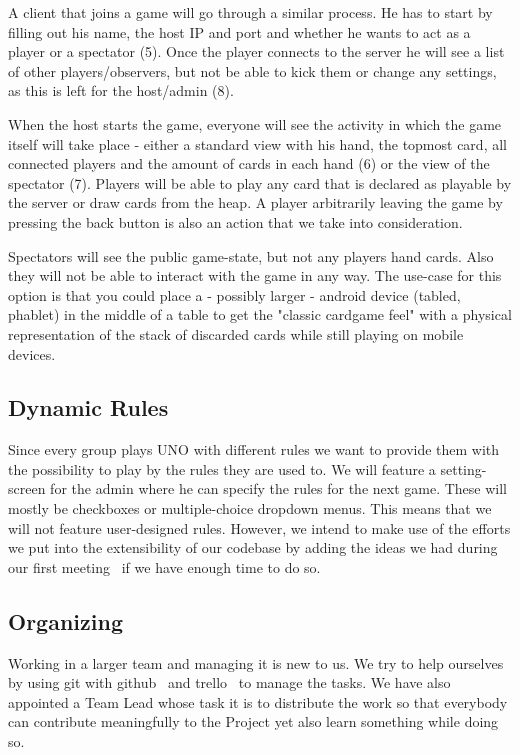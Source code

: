\documentclass{sig-alternate}
\begin{document}
A client that joins a game will go through a similar process. He has to start by filling out his name, the host IP and port and whether he wants to act as a player or a spectator (5). Once the player connects to the server he will see a list of other players/observers, but not be able to kick them or change any settings, as this is left for the host/admin (8). 

When the host starts the game, everyone will see the activity in which the game itself will take place - either a standard view with his hand, the topmost card, all connected players and the amount of cards in each hand (6) or the view of the spectator (7). Players will be able to play any card that is declared as playable by the server or draw cards from the heap. A player arbitrarily leaving the game by pressing the back button is also an action that we take into consideration.

Spectators will see the public game-state, but not any players hand cards. Also they will not be able to interact with the game in any way. The use-case for this option is that you could place a - possibly larger - android device (tabled, phablet) in the middle of a table to get the "classic cardgame feel" with a physical representation of the stack of discarded cards while still playing on mobile devices. 

\subsection{Dynamic Rules}
Since every group plays UNO with different rules we want to provide them with the possibility to play by the rules they are used to. We will feature a setting-screen for the admin where he can specify the rules for the next game. These will mostly be checkboxes or multiple-choice dropdown menus. This means that we will not feature user-designed rules. However, we intend to make use of the efforts we put into the extensibility of our codebase by adding the ideas we had during our first meeting~\cite{firstprotocol} if we have enough time to do so.

\subsection{Organizing}
Working in a larger team and managing it is new to us. We try to help ourselves by using git with github~\cite{github} and trello~\cite{trello} to manage the tasks. We have also appointed a Team Lead whose task it is to distribute the work so that everybody can contribute meaningfully to the Project yet also learn something while doing so. 
\end{document}
